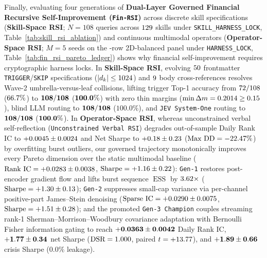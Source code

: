 Finally, evaluating four generations of \textbf{Dual-Layer Governed Financial Recursive Self-Improvement (\texttt{Fin-RSI})}
across discrete skill specifications (\textbf{Skill-Space RSI}; $N=108$ queries across $129{}$ skills under \texttt{SKILL\_HARNESS\_LOCK}, Table~\ref{tab:skill_rsi_ablation}) and continuous multimodal operators (\textbf{Operator-Space RSI}; $M=5$ seeds on the \PanelBalancedRows{}-row 2D-balanced panel under \texttt{HARNESS\_LOCK}, Table~\ref{tab:fin_rsi_pareto_ledger}) shows why financial self-improvement requires cryptographic harness locks. In \textbf{Skill-Space RSI}, evolving $50{}$ frontmatter \texttt{TRIGGER}/\texttt{SKIP} specifications ($|d_k| \le 1024{}$) and $9{}$ body cross-references resolves Wave-2 umbrella-versus-leaf collisions, lifting trigger Top-1 accuracy from $72{}/108$ ($66.7{}\%$) to $\mathbf{108{}/108}$ ($\mathbf{100.0{}\%}$) with zero thin margins ($\min \Delta m = 0.2014{} \ge 0.15$), blind LLM routing to $\mathbf{108{}/108}$ ($\mathbf{100.0\%}$), and \texttt{JEV System-One} routing to $\mathbf{108{}/108}$ ($\mathbf{100.0{}\%}$). In \textbf{Operator-Space RSI}, whereas unconstrained verbal self-reflection (\texttt{Unconstrained Verbal RSI}) degrades out-of-sample Daily Rank IC to $+0.0045{} \pm 0.0024{}$ and Net Sharpe to $+0.18{} \pm 0.23{}$ ($\text{Max DD} = -22.47{}\%$) by overfitting burst outliers, our governed trajectory monotonically improves every Pareto dimension over the static multimodal baseline ($\text{Rank IC} = +0.0283{} \pm 0.0038{}$, $\text{Sharpe} = +1.16{} \pm 0.22{}$): \texttt{Gen-1} restores post-encoder gradient flow and lifts burst sequence $\operatorname{ESS}$ by $3.62{}\times$ ($\text{Sharpe} = +1.30{} \pm 0.13{}$); \texttt{Gen-2} suppresses small-cap variance via per-channel positive-part James--Stein denoising ($\text{Sparse IC} = +0.0290{} \pm 0.0075{}$, $\text{Sharpe} = +1.51{} \pm 0.28{}$); and the promoted \texttt{Gen-3 Champion} couples streaming rank-1 Sherman--Morrison--Woodbury covariance adaptation with Bernoulli Fisher information gating to reach $\mathbf{+0.0363{} \pm 0.0042{}}$ Daily Rank IC, $\mathbf{+1.77{} \pm 0.34{}}$ net Sharpe ($\text{DSR} = 1.000{}$, paired $t = +13.77{}$), and $\mathbf{+1.89{} \pm 0.66{}}$ crisis Sharpe ($0.0\%$ leakage).


